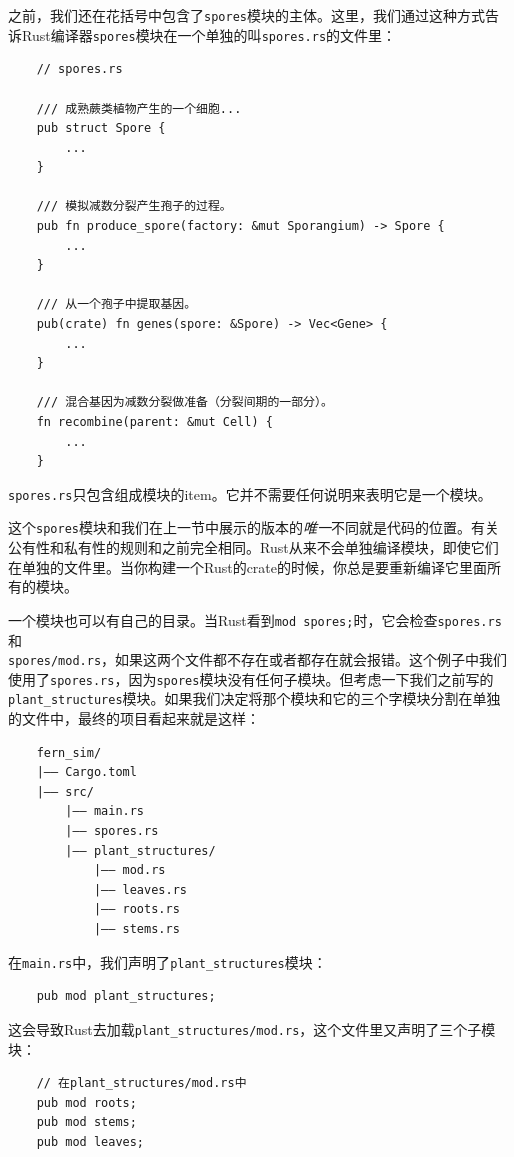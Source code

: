 之前，我们还在花括号中包含了\texttt{spores}模块的主体。这里，我们通过这种方式告诉Rust编译器\texttt{spores}模块在一个单独的叫\texttt{spores.rs}的文件里：
\begin{verbatim}
    // spores.rs

    /// 成熟蕨类植物产生的一个细胞...
    pub struct Spore {
        ...
    }

    /// 模拟减数分裂产生孢子的过程。
    pub fn produce_spore(factory: &mut Sporangium) -> Spore {
        ...
    }

    /// 从一个孢子中提取基因。
    pub(crate) fn genes(spore: &Spore) -> Vec<Gene> {
        ...
    }

    /// 混合基因为减数分裂做准备（分裂间期的一部分）。
    fn recombine(parent: &mut Cell) {
        ...
    }
\end{verbatim}

\texttt{spores.rs}只包含组成模块的item。它并不需要任何说明来表明它是一个模块。

这个\texttt{spores}模块和我们在上一节中展示的版本的\emph{唯一}不同就是代码的位置。有关公有性和私有性的规则和之前完全相同。Rust从来不会单独编译模块，即使它们在单独的文件里。当你构建一个Rust的crate的时候，你总是要重新编译它里面所有的模块。

一个模块也可以有自己的目录。当Rust看到\texttt{mod spores;}时，它会检查\texttt{spores.rs}和\\
\texttt{spores/mod.rs}，如果这两个文件都不存在或者都存在就会报错。这个例子中我们使用了\texttt{spores.rs}，因为\texttt{spores}模块没有任何子模块。但考虑一下我们之前写的\texttt{plant\_structures}模块。如果我们决定将那个模块和它的三个字模块分割在单独的文件中，最终的项目看起来就是这样：
\begin{verbatim}
    fern_sim/
    |—— Cargo.toml
    |—— src/
        |—— main.rs
        |—— spores.rs
        |—— plant_structures/
            |—— mod.rs
            |—— leaves.rs
            |—— roots.rs
            |—— stems.rs
\end{verbatim}

在\texttt{main.rs}中，我们声明了\texttt{plant\_structures}模块：
\begin{verbatim}
    pub mod plant_structures;
\end{verbatim}

这会导致Rust去加载\texttt{plant\_structures/mod.rs}，这个文件里又声明了三个子模块：
\begin{verbatim}
    // 在plant_structures/mod.rs中
    pub mod roots;
    pub mod stems;
    pub mod leaves;
\end{verbatim}

